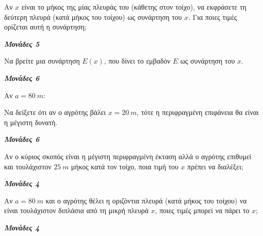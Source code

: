 \documentclass[11pt,a4paper,twoside]{book}
\newcommand{\monades}[1]{
\hspace*{\fill}
\textbf{\textit{\textcolor{maincolor}{Μονάδες #1}}}}
\begin{document}
\begin{alist}
\item Αν $x$ είναι το μήκος της μίας πλευράς του (κάθετης στον τοίχο), να εκφράσετε τη δεύτερη πλευρά (κατά μήκος του τοίχου) ως συνάρτηση του $x$. Για ποιες τιμές ορίζεται αυτή η συνάρτηση;
\monades{5}
\item Να βρείτε μια συνάρτηση $E(x)$, που δίνει το εμβαδόν $E$ ως συνάρτηση του $x$.
\monades{6}
\item Αν $a = 80\ m$:

\begin{rlist}
\item Να δείξετε ότι αν ο αγρότης βάλει $x = 20\ m$, τότε η περιφραγμένη επιφάνεια θα είναι η μέγιστη δυνατή.
\monades{6}
\item Αν ο κύριος σκοπός είναι η μέγιστη περιφραγμένη έκταση αλλά ο αγρότης επιθυμεί και τουλάχιστον $25\ m$ μήκος κατά τον τοίχο, ποια τιμή του $x$ πρέπει να διαλέξει;
\monades{4}
\end{rlist}
\item Αν $a = 80\ m$ και ο αγρότης θέλει η οριζόντια πλευρά (κατά μήκος του τοίχου) να είναι τουλάχιστον διπλάσια από τη μικρή πλευρά $x$, ποιες τιμές μπορεί να πάρει το $x$;
\monades{4}
\end{alist}

\vspace{4mm}
\end{document}
